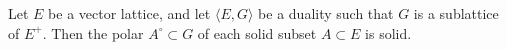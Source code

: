 Let $E$ be a vector lattice, and let $\langle E, G \rangle$ be a duality such that $G$ is a sublattice of $E^+$. Then the polar $A^\circ \subset G$ of each solid subset $A \subset E$ is solid.
